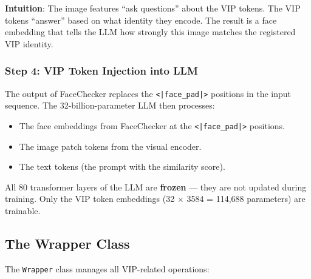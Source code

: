 \documentclass[12pt,a4paper]{article}
\begin{document}
\textbf{Intuition}: The image features ``ask questions'' about the VIP tokens. The VIP tokens ``answer'' based on what identity they encode. The result is a face embedding that tells the LLM how strongly this image matches the registered VIP identity.

\subsubsection{Step 4: VIP Token Injection into LLM}

The output of FaceChecker replaces the \texttt{<|face\_pad|>} positions in the input sequence. The 32-billion-parameter LLM then processes:
\begin{itemize}
    \item The face embeddings from FaceChecker at the \texttt{<|face\_pad|>} positions.
    \item The image patch tokens from the visual encoder.
    \item The text tokens (the prompt with the similarity score).
\end{itemize}

All 80 transformer layers of the LLM are \textbf{frozen} --- they are not updated during training. Only the VIP token embeddings (32 $\times$ 3584 = 114,688 parameters) are trainable.

\subsection{The Wrapper Class}

The \texttt{Wrapper} class manages all VIP-related operations:
\end{document}
